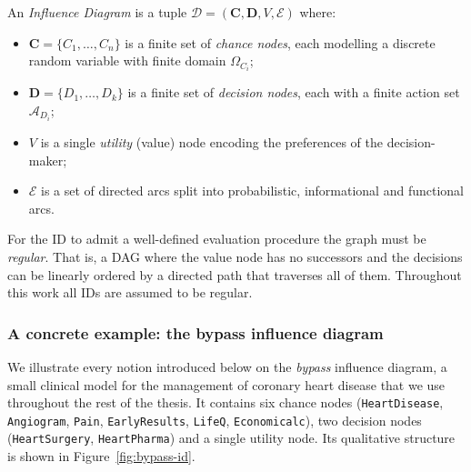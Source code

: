 \begin{definition}
\label{def:id}
An \emph{Influence Diagram} is a tuple
$\mathcal{D} = (\mathbf{C}, \mathbf{D}, V, \mathcal{E})$ where:
\begin{itemize}
    \item $\mathbf{C} = \{C_1,\ldots,C_n\}$ is a finite set of
          \emph{chance nodes}, each modelling a discrete random
          variable with finite domain $\Omega_{C_i}$;
    \item $\mathbf{D} = \{D_1,\ldots,D_k\}$ is a finite set of
          \emph{decision nodes}, each with a finite action set
          $\mathcal{A}_{D_i}$;
    \item $V$ is a single \emph{utility} (value) node encoding the
          preferences of the decision-maker;
    \item $\mathcal{E}$ is a set of directed arcs split into
          probabilistic, informational and functional arcs.
\end{itemize}
\end{definition}

For the ID to admit a well-defined evaluation procedure the graph
must be \emph{regular}. That is, a DAG where the value node has no successors and the decisions can be linearly ordered by a directed path that traverses all of them. Throughout this work all IDs are
assumed to be regular.

\subsubsection*{A concrete example: the bypass influence diagram}
\label{sec:bypass-id-intro}

We illustrate every notion introduced below on the \emph{bypass}
influence diagram, a small clinical model for the management of
coronary heart disease that we use throughout the rest of the
thesis. It contains six chance nodes
(\texttt{HeartDisease}, \texttt{Angiogram}, \texttt{Pain},
\texttt{EarlyResults}, \texttt{LifeQ}, \texttt{Economicalc}), two
decision nodes (\texttt{HeartSurgery}, \texttt{HeartPharma}) and a
single utility node. Its qualitative structure is shown in
Figure~\ref{fig:bypass-id}.

